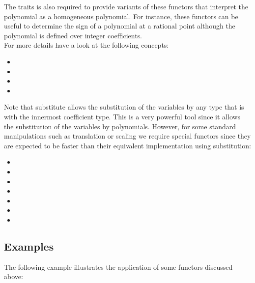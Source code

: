 The traits is also required to provide variants of these functors that 
interpret the polynomial as a homogeneous polynomial. 
For instance, these functors can be useful to determine the sign of a 
polynomial at a rational point although the polynomial is defined 
over integer coefficients. \\
For more details have a look at the following concepts:
\begin{itemize}
\item {}
\item {}
\item {}
\item {}
\end{itemize}

Note that substitute allows the substitution of the variables by any type that 
is  with the innermost coefficient type. 
This is a very powerful tool since it allows the substitution of the variables 
by polynomials. However, for some standard manipulations such as translation 
or scaling we require special functors since they are expected to be faster 
than their equivalent implementation using substitution: \\

\begin{itemize}
\item {}
\item {}
\item {}
\item {}
\item {}
\item {}
\item {}
\end{itemize}

\subsection{Examples}   
The following example illustrates the application of some functors 
discussed above:
